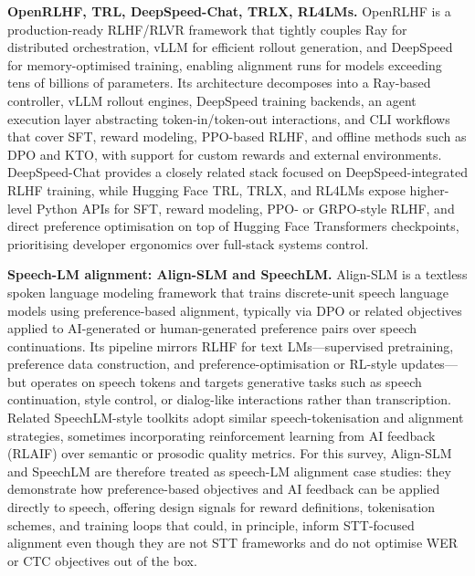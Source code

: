 \documentclass[conference]{IEEEtran}
\begin{document}
\textbf{OpenRLHF, TRL, DeepSpeed-Chat, TRLX, RL4LMs.}
OpenRLHF is a production-ready RLHF/RLVR framework that tightly couples Ray for distributed orchestration, vLLM for efficient rollout generation, and DeepSpeed for memory-optimised training, enabling alignment runs for models exceeding tens of billions of parameters.
Its architecture decomposes into a Ray-based controller, vLLM rollout engines, DeepSpeed training backends, an agent execution layer abstracting token-in/token-out interactions, and CLI workflows that cover SFT, reward modeling, PPO-based RLHF, and offline methods such as DPO and KTO, with support for custom rewards and external environments.
DeepSpeed-Chat provides a closely related stack focused on DeepSpeed-integrated RLHF training, while Hugging Face TRL, TRLX, and RL4LMs expose higher-level Python APIs for SFT, reward modeling, PPO- or GRPO-style RLHF, and direct preference optimisation on top of Hugging Face Transformers checkpoints, prioritising developer ergonomics over full-stack systems control.

\textbf{Speech-LM alignment: Align-SLM and SpeechLM.}
Align-SLM is a textless spoken language modeling framework that trains discrete-unit speech language models using preference-based alignment, typically via DPO or related objectives applied to AI-generated or human-generated preference pairs over speech continuations.
Its pipeline mirrors RLHF for text LMs—supervised pretraining, preference data construction, and preference-optimisation or RL-style updates—but operates on speech tokens and targets generative tasks such as speech continuation, style control, or dialog-like interactions rather than transcription.
Related SpeechLM-style toolkits adopt similar speech-tokenisation and alignment strategies, sometimes incorporating reinforcement learning from AI feedback (RLAIF) over semantic or prosodic quality metrics.
For this survey, Align-SLM and SpeechLM are therefore treated as speech-LM alignment case studies: they demonstrate how preference-based objectives and AI feedback can be applied directly to speech, offering design signals for reward definitions, tokenisation schemes, and training loops that could, in principle, inform STT-focused alignment even though they are not STT frameworks and do not optimise WER or CTC objectives out of the box.
\end{document}
